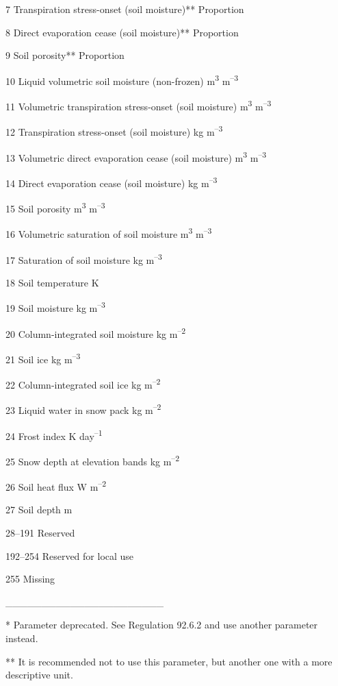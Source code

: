 7 Transpiration stress-onset (soil moisture)** Proportion

8 Direct evaporation cease (soil moisture)** Proportion

9 Soil porosity** Proportion

10 Liquid volumetric soil moisture (non-frozen) m\textsuperscript{3} m\textsuperscript{--3}

11 Volumetric transpiration stress-onset (soil moisture) m\textsuperscript{3} m\textsuperscript{--3}

12 Transpiration stress-onset (soil moisture) kg m\textsuperscript{--3}

13 Volumetric direct evaporation cease (soil moisture) m\textsuperscript{3} m\textsuperscript{--3}

14 Direct evaporation cease (soil moisture) kg m\textsuperscript{--3}

15 Soil porosity m\textsuperscript{3} m\textsuperscript{--3}

16 Volumetric saturation of soil moisture m\textsuperscript{3} m\textsuperscript{--3}

17 Saturation of soil moisture kg m\textsuperscript{--3}

18 Soil temperature K

19 Soil moisture kg m\textsuperscript{--3}

20 Column-integrated soil moisture kg m\textsuperscript{--2}

21 Soil ice kg m\textsuperscript{--3}

22 Column-integrated soil ice kg m\textsuperscript{--2}

23 Liquid water in snow pack kg m\textsuperscript{--2}

24 Frost index K day\textsuperscript{--1}

25 Snow depth at elevation bands kg m\textsuperscript{--2}

26 Soil heat flux W m\textsuperscript{--2}

27 Soil depth m

28--191 Reserved

192--254 Reserved for local use

255 Missing

\_\_\_\_\_\_\_\_\_\_\_\_\_\_\_\_\_\_\_\_\_\_

* Parameter deprecated. See Regulation 92.6.2 and use another parameter instead.

** It is recommended not to use this parameter, but another one with a more descriptive unit.

